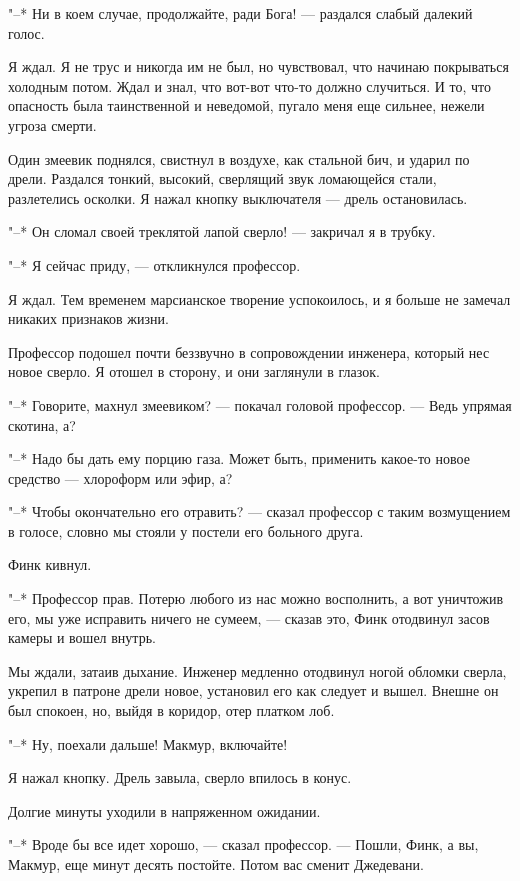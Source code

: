 "--* Ни в коем случае, продолжайте, ради Бога! --- раздался  слабый  далекий
голос.

Я ждал. Я не трус и никогда им  не  был,  но  чувствовал,  что  начинаю
покрываться холодным  потом.  Ждал  и  знал,  что  вот-вот  что-то  должно
случиться. И то, что опасность была таинственной и неведомой, пугало  меня
еще сильнее, нежели угроза смерти.

Один змеевик поднялся, свистнул в воздухе, как стальной бич,  и  ударил
по дрели. Раздался  тонкий,  высокий,  сверлящий  звук  ломающейся  стали,
разлетелись осколки. Я нажал кнопку выключателя --- дрель остановилась.

"--* Он сломал своей треклятой лапой сверло! --- закричал я в трубку.

"--* Я сейчас приду, --- откликнулся профессор.

Я ждал. Тем временем марсианское творение успокоилось, и  я  больше  не
замечал никаких признаков жизни.

Профессор подошел почти беззвучно в сопровождении инженера, который нес
новое сверло. Я отошел в сторону, и они заглянули в глазок.

"--* Говорите, махнул змеевиком?  ---  покачал  головой  профессор.  ---  Ведь
упрямая скотина, а?

"--* Надо бы дать ему порцию газа. Может быть,  применить  какое-то  новое
средство --- хлороформ или эфир, а?

"--*  Чтобы  окончательно  его  отравить?  ---  сказал  профессор  с   таким
возмущением в голосе, словно мы стояли у постели его больного друга.

Финк кивнул.

"--* Профессор  прав.  Потерю  любого  из  нас  можно  восполнить,  а  вот
уничтожив его, мы уже исправить ничего  не  сумеем,  ---  сказав  это,  Финк
отодвинул засов камеры и вошел внутрь.

Мы ждали, затаив дыхание.  Инженер  медленно  отодвинул  ногой  обломки
сверла, укрепил в патроне дрели новое, установил его как следует и  вышел.
Внешне он был спокоен, но, выйдя в коридор, отер платком лоб.

"--* Ну, поехали дальше! Макмур, включайте!

Я нажал кнопку. Дрель завыла, сверло впилось в конус.

Долгие минуты уходили в напряженном ожидании.

"--* Вроде бы все идет хорошо, --- сказал профессор. --- Пошли,  Финк,  а  вы,
Макмур, еще минут десять постойте. Потом вас сменит Джедевани.


